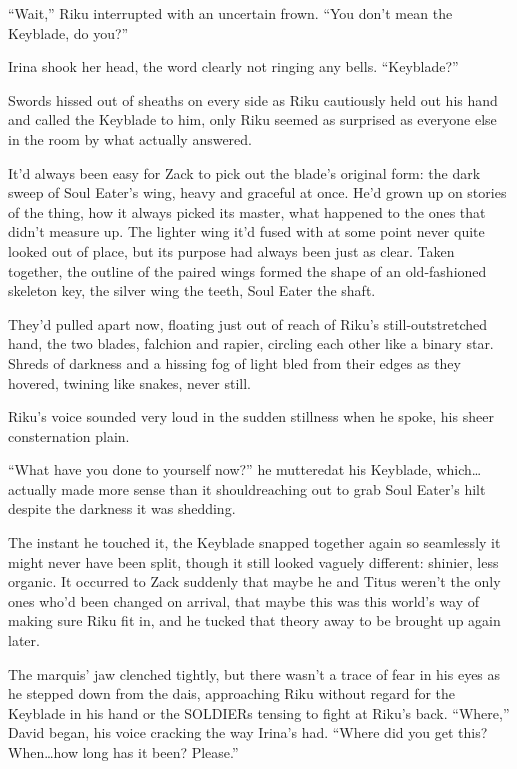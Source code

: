 ``Wait,'' Riku interrupted with an uncertain frown. ``You don't mean the Keyblade, do you?''

Irina shook her head, the word clearly not ringing any bells. ``Keyblade?''

Swords hissed out of sheaths on every side as Riku cautiously held out his hand and called the Keyblade to him, only Riku seemed as surprised as everyone else in the room by what actually answered.

It'd always been easy for Zack to pick out the blade's original form: the dark sweep of Soul Eater's wing, heavy and graceful at once. He'd grown up on stories of the thing, how it always picked its master, what happened to the ones that didn't measure up. The lighter wing it'd fused with at some point never quite looked out of place, but its purpose had always been just as clear. Taken together, the outline of the paired wings formed the shape of an old-fashioned skeleton key, the silver wing the teeth, Soul Eater the shaft.

They'd pulled apart now, floating just out of reach of Riku's still-outstretched hand, the two blades, falchion and rapier, circling each other like a binary star. Shreds of darkness and a hissing fog of light bled from their edges as they hovered, twining like snakes, never still.

Riku's voice sounded very loud in the sudden stillness when he spoke, his sheer consternation plain.

``What have you done to yourself now?'' he muttered\textemdash at his Keyblade, which\ldots actually made more sense than it should\textemdash reaching out to grab Soul Eater's hilt despite the darkness it was shedding.

The instant he touched it, the Keyblade snapped together again so seamlessly it might never have been split, though it still looked vaguely different: shinier, less organic. It occurred to Zack suddenly that maybe he and Titus weren't the only ones who'd been changed on arrival, that maybe this was this world's way of making sure Riku fit in, and he tucked that theory away to be brought up again later.

The marquis' jaw clenched tightly, but there wasn't a trace of fear in his eyes as he stepped down from the dais, approaching Riku without regard for the Keyblade in his hand or the SOLDIERs tensing to fight at Riku's back. ``Where,'' David began, his voice cracking the way Irina's had. ``Where did you get this? When\ldots how long has it been? Please.''

